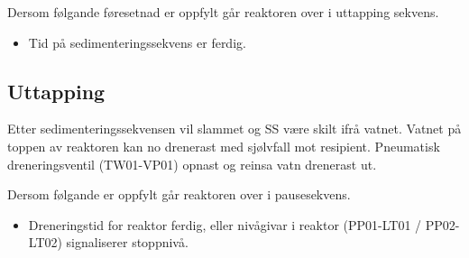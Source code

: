 Dersom følgande føresetnad er oppfylt går reaktoren over i uttapping sekvens.
\begin{itemize}
    \item Tid på sedimenteringssekvens er ferdig.
\end{itemize}

\subsection{Uttapping}
Etter sedimenteringssekvensen vil slammet og SS være skilt ifrå vatnet. 
Vatnet på toppen av reaktoren kan no drenerast med sjølvfall mot resipient. 
Pneumatisk dreneringsventil (TW01-VP01) opnast og reinsa vatn drenerast ut.

Dersom følgande er oppfylt går reaktoren over i pausesekvens.
\begin{itemize}
    \item Dreneringstid for reaktor ferdig, eller nivågivar i reaktor (PP01-LT01 / PP02-LT02) signaliserer stoppnivå.
\end{itemize}